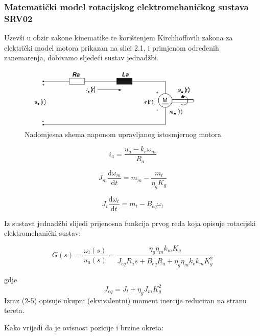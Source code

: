 \documentclass[12pt,a4paper]{article}
\begin{document}
\subsubsection{Matematički model rotacijskog elektromehaničkog sustava SRV02}
Uzevši u obzir zakone kinematike te korištenjem Kirchhoffovih zakona za električki model motora prikazan na slici 2.1, i primjenom određenih zanemarenja, dobivamo sljedeći sustav jednadžbi.

\begin{figure}[h]
	\begin{center}
	\includegraphics[width=0.8\textwidth] {ele_motor.png}
    \caption{Nadomjesna shema naponom upravljanog istosmjernog motora}
    \end{center}
\end{figure}

\begin{equation}
 i_a=\frac{u_a-k_e\omega_m}{R_a}
\end{equation}

\begin{equation}
 J_m\frac{\mathrm{d}\omega_m}{\mathrm{d}t}=m_m - \frac{m_t}{\eta_gK_g}
\end{equation}

\begin{equation}
J_t\frac{\mathrm{d}\omega_t}{\mathrm{d}t}=m_t - B_{eq}\omega_t
\end{equation}

Iz sustava jednadžbi slijedi prijenosna funkcija prvog reda koja opisuje rotacijski elektromehanički sustav:

\begin{equation}
G(s)=\frac{\omega_t(s)}{u_a(s)}=\frac{\eta_g\eta_mk_mK_g}{J_{eq}R_as + B_{eq}R_a+\eta_g\eta_mk_ek_mK_g^2}
\end{equation}

gdje \begin{equation}J_{eq}=J_t+\eta_gJ_mK_g^2\end{equation}
Izraz (2-5) opisuje ukupni (ekvivalentni) moment inercije reduciran na stranu tereta.
\newline

Kako vrijedi da je ovisnost pozicije i brzine okreta:
\end{document}
